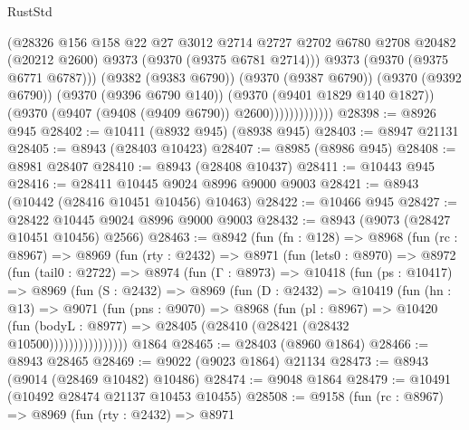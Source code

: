 \begin{lexlean}{RustStd}
\begin{coremodule}
{\begin{coremodule}
{{{{{{{{{{{{{{{{{{{{{{{{{{{{{{{{{{{{{{{                            (@28326
                              @156
                              @158
                              @22
                              @27
                              @3012
                              @2714
                              @2727
                              @2702
                              @6780
                              @2708
                              @20482
                              (@20212 @2600)
                              @9373
                              (@9370 (@9375 @6781 @2714)))
                            @9373
                            (@9370 (@9375 @6771 @6787)))
                          (@9382 (@9383 @6790))
                          (@9370 (@9387 @6790))
                          (@9370 (@9392 @6790))
                          (@9370 (@9396 @6790 @140))
                          (@9370 (@9401 @1829 @140 @1827))
                          (@9370 (@9407 (@9408 (@9409 @6790)) @2600)))))))))))))
@28398 := @8926 @945
@28402 := @10411 (@8932 @945) (@8938 @945)
@28403 := @8947 @21131
@28405 := @8943 (@28403 @10423)
@28407 := @8985 (@8986 @945)
@28408 := @8981 @28407
@28410 := @8943 (@28408 @10437)
@28411 := @10443 @945
@28416 := @28411 @10445 @9024 @8996 @9000 @9003
@28421 := @8943 (@10442 (@28416 @10451 @10456) @10463)
@28422 := @10466 @945
@28427 := @28422 @10445 @9024 @8996 @9000 @9003
@28432 := @8943 (@9073 (@28427 @10451 @10456) @2566)
@28463 := @8942
    (fun (fn : @128) =>
    @8968
      (fun (rc : @8967) =>
      @8969
        (fun (rty : @2432) =>
        @8971
          (fun (lets0 : @8970) =>
          @8972
            (fun (tail0 : @2722) =>
            @8974
              (fun (Γ : @8973) =>
              @10418
                (fun (ps : @10417) =>
                @8969
                  (fun (S : @2432) =>
                  @8969
                    (fun (D : @2432) =>
                    @10419
                      (fun (hn : @13) =>
                      @9071
                        (fun (pns : @9070) =>
                        @8968
                          (fun (pl : @8967) =>
                          @10420
                            (fun (bodyL : @8977) =>
                            @28405 (@28410 (@28421 (@28432 @10500))))))))))))))))
    @1864
@28465 := @28403 (@8960 @1864)
@28466 := @8943 @28465
@28469 := @9022 (@9023 @1864) @21134
@28473 := @8943 (@9014 (@28469 @10482) @10486)
@28474 := @9048 @1864
@28479 := @10491 (@10492 @28474 @21137 @10453 @10455)
@28508 := @9158
    (fun (rc : @8967) =>
    @8969
      (fun (rty : @2432) =>
      @8971
}}}}}}}}}}}}}}}}}}}}}}}}}}}}}}}}}}}}}}}
\end{coremodule}}
\end{coremodule}
\end{lexlean}
